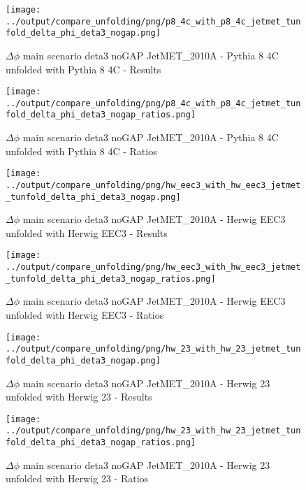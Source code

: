 \documentclass[11pt]{book}
\begin{document}
\begin{figure}[ht]
\centering
\texttt{[image: ../output/compare\_unfolding/png/p8\_4c\_with\_p8\_4c\_jetmet\_tunfold\_delta\_phi\_deta3\_nogap.png]}
\caption{$\Delta\phi$ main scenario deta3 noGAP JetMET\_2010A - Pythia 8 4C unfolded with Pythia 8 4C - Results}
\label{p8_p8_jetmet_tunfold_delta_phi_deta3_nogap_a}
\end{figure}

\begin{figure}[ht]
\centering
\texttt{[image: ../output/compare\_unfolding/png/p8\_4c\_with\_p8\_4c\_jetmet\_tunfold\_delta\_phi\_deta3\_nogap\_ratios.png]}
\caption{$\Delta\phi$ main scenario deta3 noGAP JetMET\_2010A - Pythia 8 4C unfolded with Pythia 8 4C - Ratios}
\label{p8_p8_jetmet_tunfold_delta_phi_deta3_nogap_b}
\end{figure}

\begin{figure}[ht]
\centering
\texttt{[image: ../output/compare\_unfolding/png/hw\_eec3\_with\_hw\_eec3\_jetmet\_tunfold\_delta\_phi\_deta3\_nogap.png]}
\caption{$\Delta\phi$ main scenario deta3 noGAP JetMET\_2010A - Herwig EEC3 unfolded with Herwig EEC3 - Results}
\label{hw_eec3_hw_eec3_jetmet_tunfold_delta_phi_deta3_nogap_a}
\end{figure}

\begin{figure}[ht]
\centering
\texttt{[image: ../output/compare\_unfolding/png/hw\_eec3\_with\_hw\_eec3\_jetmet\_tunfold\_delta\_phi\_deta3\_nogap\_ratios.png]}
\caption{$\Delta\phi$ main scenario deta3 noGAP JetMET\_2010A - Herwig EEC3 unfolded with Herwig EEC3 - Ratios}
\label{hw_eec3_hw_eec3_jetmet_tunfold_delta_phi_deta3_nogap_b}
\end{figure}

\begin{figure}[ht]
\centering
\texttt{[image: ../output/compare\_unfolding/png/hw\_23\_with\_hw\_23\_jetmet\_tunfold\_delta\_phi\_deta3\_nogap.png]}
\caption{$\Delta\phi$ main scenario deta3 noGAP JetMET\_2010A - Herwig 23 unfolded with Herwig 23 - Results}
\label{hw_23_hw_23_jetmet_tunfold_delta_phi_deta3_nogap_a}
\end{figure}

\begin{figure}[ht]
\centering
\texttt{[image: ../output/compare\_unfolding/png/hw\_23\_with\_hw\_23\_jetmet\_tunfold\_delta\_phi\_deta3\_nogap\_ratios.png]}
\caption{$\Delta\phi$ main scenario deta3 noGAP JetMET\_2010A - Herwig 23 unfolded with Herwig 23 - Ratios}
\label{hw_23_hw_23_jetmet_tunfold_delta_phi_deta3_nogap_b}
\end{figure}
\end{document}
